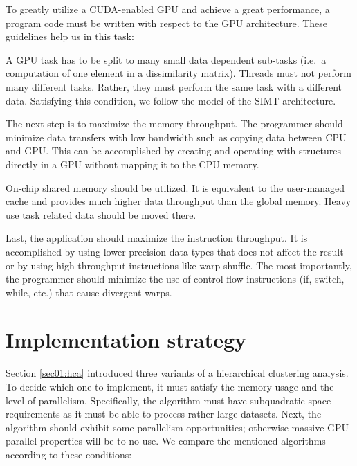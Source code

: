 To greatly utilize a CUDA-enabled GPU and achieve a great performance, a program code must be written with respect to the GPU architecture. These guidelines help us in this task:

A GPU task has to be split to many small data dependent sub-tasks (i.e.~a computation of one element in a dissimilarity matrix). Threads must not perform many different tasks. Rather, they must perform the same task with a different data. Satisfying this condition, we follow the model of the SIMT architecture.

The next step is to maximize the memory throughput. The programmer should minimize data transfers with low bandwidth such as copying data between CPU and GPU. This can be accomplished by creating and operating with structures directly in a GPU without mapping it to the CPU memory.


On-chip shared memory should be utilized. It is equivalent to the user-ma\-na\-ged cache and provides much higher data throughput than the global memory. 
Heavy use task related data should be moved there.

Last, the application should maximize the instruction throughput. It is accomplished by using lower precision data types that does not affect the result or by using high throughput instructions like warp shuffle. The most importantly, the programmer should minimize the use of control flow instructions (if, switch, while, etc.) that cause divergent warps. 


\section{Implementation strategy}

Section \ref{sec01:hca} introduced three variants of a hierarchical clustering analysis. To decide which one to implement, it must satisfy the memory usage and the level of parallelism. Specifically, the algorithm must have subquadratic space requirements as it must be able to process rather large datasets. Next, the algorithm should exhibit some parallelism opportunities; otherwise massive GPU parallel properties will be to no use.  We compare the mentioned algorithms according to these conditions:

